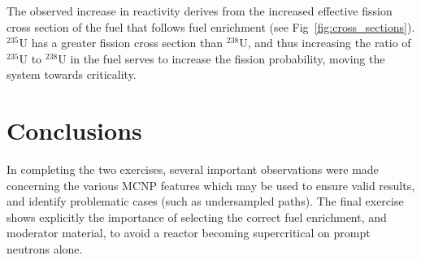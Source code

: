 \documentclass{article}
\begin{document}
    The observed increase in reactivity derives from the increased effective fission cross section of the fuel that follows fuel enrichment (see Fig~\ref{fig:cross_sections}). $^{235}\text{U}$ has a greater fission cross section than $^{238}\text{U}$, and thus increasing the ratio of $^{235}\text{U}$ to $^{238}\text{U}$ in the fuel serves to increase the fission probability, moving the system towards criticality.

\section{Conclusions}
  In completing the two exercises, several important observations were made concerning the various MCNP features which may be used to ensure valid results, and identify problematic cases (such as undersampled paths). The final exercise shows explicitly the importance of selecting the correct fuel enrichment, and moderator material, to avoid a reactor becoming supercritical on prompt neutrons alone.



    
\printbibliography
\end{document}
